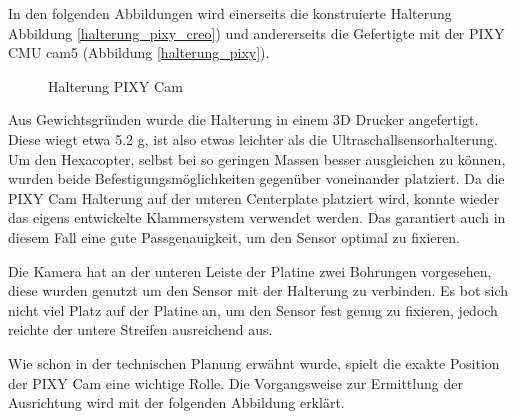 	In den folgenden Abbildungen wird einerseits die konstruierte Halterung Abbildung \ref{halterung_pixy_creo})
	und andererseits die Gefertigte  mit der PIXY CMU cam5 (Abbildung \ref{halterung_pixy}).

			\begin{figure}[thb]
				\begin{centering}
				\par\end{centering}
				\caption{Halterung PIXY Cam}
				\label{Halterung_PIXY}
			\end{figure}

	Aus Gewichtsgründen wurde die Halterung in einem 3D Drucker angefertigt.
	Diese wiegt etwa 5.2 g, ist also etwas leichter als die Ultraschallsensorhalterung.
	Um den Hexacopter, selbst bei so geringen Massen besser ausgleichen zu können, wurden beide Befestigungsmöglichkeiten gegenüber voneinander platziert.
	Da die PIXY Cam Halterung auf der unteren Centerplate platziert wird, konnte wieder das eigens entwickelte Klammersystem verwendet werden.
	Das garantiert auch in diesem Fall eine gute Passgenauigkeit, um den Sensor optimal zu fixieren.

	Die Kamera hat an der unteren Leiste der Platine zwei Bohrungen vorgesehen, diese wurden genutzt um den Sensor mit der Halterung zu verbinden.
	Es bot sich nicht viel Platz auf der Platine an, um den Sensor fest genug zu fixieren, jedoch reichte der untere Streifen ausreichend aus.

	Wie schon in der technischen Planung erwähnt wurde, spielt die exakte Position der PIXY Cam eine wichtige Rolle.
	Die Vorgangsweise zur Ermittlung der Ausrichtung wird mit der folgenden Abbildung erklärt.

